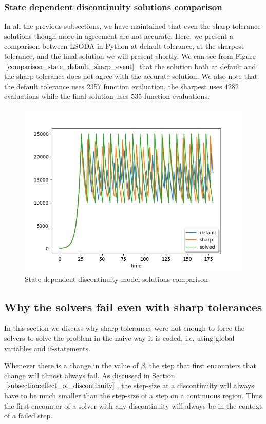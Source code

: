 \subsubsection{State dependent discontinuity solutions comparison}
\label{subsubsection:state_solution_comparison}
In all the previous subsections, we have maintained that even the sharp tolerance solutions though more in agreement are not accurate. Here, we present a comparison between LSODA in Python at default tolerance, at the sharpest tolerance, and the final solution we will present shortly. We can see from Figure $\ref{comparison_state_default_sharp_event}$ that the solution both at default and the sharp tolerance does not agree with the accurate solution. We also note that the default tolerance uses 2357 function evaluation, the sharpest uses 4282 evaluations while the final solution uses 535 function evaluations.

\begin{figure}[h]
\centering
\includegraphics[width=0.7\linewidth]{./figures/comparison_state_default_sharp_event}
\caption{State dependent discontinuity model solutions comparison}
\label{fig:comparison_state_default_sharp_event}
\end{figure}

\subsection{Why the solvers fail even with sharp tolerances}
\label{subsection:state_sharp_tol_failed}
In this section we discuss why sharp tolerances were not enough to force the solvers to solve the problem in the naive way it is coded, i.e, using global variables and if-statements. 

Whenever there is a change in the value of $\beta$, the step that first encounters that change will almost always fail. As discussed in Section $\ref{subsection:effect_of_discontinuity}$, the step-size at a discontinuity will always have to be much smaller than the step-size of a step on a continuous region. Thus the first encounter of a solver with any discontinuity will always be in the context of a failed step.

